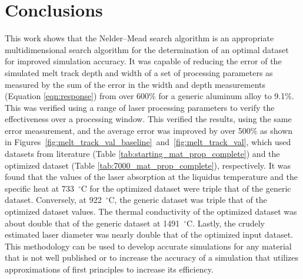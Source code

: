\documentclass[metals,article,accept,pdftex,moreauthors]{Definitions/mdpi}
\begin{document}
\section{Conclusions}
\label{sec:conclusions}
\label{conclusions}

This work shows that the Nelder--Mead search algorithm is an appropriate 
multidimensional search algorithm for the determination of an optimal dataset for 
improved simulation accuracy.  
It was capable of reducing the error of the simulated melt track depth and width of a set of processing parameters as measured by the sum of the error in the width and depth measurements (Equation \eqref{eqn:response}) from over 600\% for a generic aluminum alloy to 9.1\%.
This was verified using a range of laser processing parameters to verify the effectiveness 
over a processing window.  This verified the results, using the same error measurement, 
and the average error was improved by over 500\%
as shown in \mbox{Figures \ref{fig:melt_track_val_baseline} and 
\ref{fig:melt_track_val}}, which used datasets from literature (Table 
\ref{tab:starting_mat_prop_complete}) and the optimized dataset (Table 
\ref{tab:7000_mat_prop_complete}), respectively.  
It was found that the values of the laser absorption at the liquidus temperature and the 
specific heat at 733~$^{\circ}$C for the optimized dataset were triple that of the generic 
dataset.  Conversely, at 922~$^{\circ}$C, the generic dataset was triple that of the 
optimized dataset values.  The thermal conductivity of the optimized dataset was about 
double that of the generic dataset at 1491~$^{\circ}$C.  Lastly, the crudely estimated laser 
diameter  %
was nearly double that of the optimized input dataset.
This methodology can be used to develop accurate simulations for any material that is not well published or to increase the accuracy of a simulation that utilizes approximations of first principles to increase its efficiency.



\vspace{6pt} 

\end{document}
